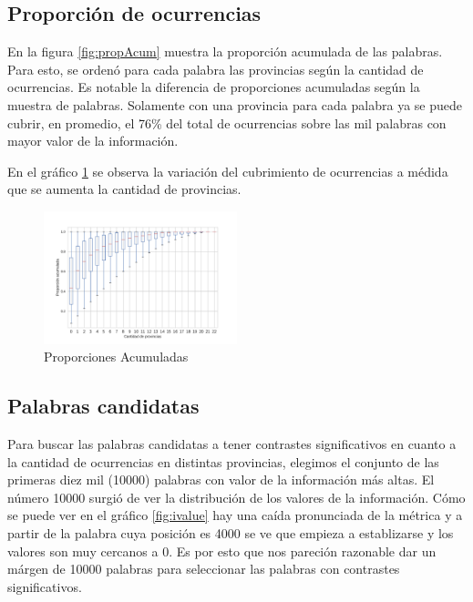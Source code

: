\subsection{Proporción de ocurrencias} %
\label{sub:proporcionDeOcurrencias}


En la figura \ref{fig:propAcum} muestra la proporción acumulada de las palabras. Para esto, se ordenó para cada palabra las provincias según la cantidad de ocurrencias. Es notable la diferencia de proporciones acumuladas según la muestra de palabras. Solamente con una provincia para cada palabra ya se puede cubrir, en promedio, el 76\% del total de ocurrencias sobre las mil palabras con mayor valor de la información.

En el gráfico \ref{fig:propAcum5000} se observa la variación del cubrimiento de ocurrencias a médida que se aumenta la cantidad de provincias. 


\begin{figure}[h]
\centering
\includegraphics[width=0.5\textwidth]{./images/PropAcum5000.pdf}
\caption{Proporciones Acumuladas} 
\label{fig:propAcum5000} 
\end{figure}

\subsection{Palabras candidatas} %
\label{sub:palabras_candidatas}
Para buscar las palabras candidatas a tener contrastes significativos en cuanto a la cantidad de ocurrencias en distintas provincias, elegimos el conjunto de las primeras 
diez mil (10000) palabras con valor de la información más altas. El número 10000 surgió de ver la distribución de los valores de la información. Cómo se puede ver en 
el gráfico \ref{fig:ivalue} hay una caída pronunciada de la métrica y a partir de la palabra cuya posición es 4000 se ve que empieza a establizarse y los valores son 
muy cercanos a 0. Es por esto que nos pareción razonable dar un márgen de 10000 palabras para seleccionar las palabras con contrastes significativos.


